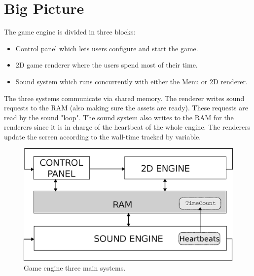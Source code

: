 \documentclass[book.tex]{subfiles}
\begin{document}
\section{Big Picture}
The game engine is divided in three blocks:
\begin{itemize}
\item Control panel which lets users configure and start the game.
\item 2D game renderer where the users spend most of their time.
\item Sound system which runs concurrently with either the Menu or 2D renderer. 
\end{itemize}
The three systems communicate via shared memory. The renderer writes sound requests to the RAM (also making sure the assets are ready). These requests are read by the sound "loop". The sound system also writes to the RAM for the renderers since it is in charge of the heartbeat of the whole engine. The renderers update the screen according to the wall-time tracked by  variable.
\par
\begin{figure}[H]
\centering
 \includegraphics[width=\textwidth]{imgs/drawings/three_systems.eps}
 \caption{Game engine three main systems.}
 \end{figure}
 \par
 
\end{document}
